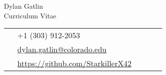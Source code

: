 \documentclass[11pt]{article} %
\begin{document}
\begin{paracol}{2} %


\parbox[top][0.12\textheight][c]{\linewidth}{ %
    \vspace{-0.04\textheight} %
    \centering %
    {\sffamily\Huge Dylan Gatlin}\\\medskip %
    {\Huge\color{headings}\cvtextfont Curriculum Vitae}
}
\switchcolumn

\parbox[top][0.12\textheight][c]{\linewidth}{ %
    \vspace{-0.04\textheight} %
    \colorbox{shade}{ %
        \begin{supertabular}{p{0.05\linewidth}|p{0.775\linewidth}} %
            \raisebox{-1pt}{\faPhone} & +1 (303) 912-2053 \\ %
            \raisebox{0pt}{\small\faEnvelope} & \href{mailto:dylan.gatlin@colorado.edu}{dylan.gatlin@colorado.edu} \\ %
            \raisebox{-1pt}{\faGithub} & \href{https://github.com/StarkillerX42}{https://github.com/StarkillerX42} \\ %
        \end{supertabular}
    }
}
\end{paracol}
\end{document}
